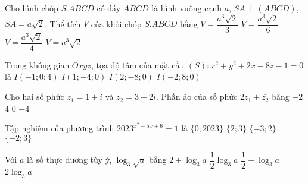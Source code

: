 \begin{ex}%
	Cho hình chóp $S.ABCD$ có đáy $ABCD$ là hình vuông cạnh $a$, $SA\perp (ABCD)$, $SA=a\sqrt{2}$. Thể tích $V$ của khối chóp $S.ABCD$ bằng
	\choice
	{\True $V=\dfrac{a^3\sqrt{2}}{3}$}
	{$V=\dfrac{a^3\sqrt{2}}{6}$}
	{$V=\dfrac{a^3\sqrt{2}}{4}$}
	{$V=a^3\sqrt{2}$}
\end{ex}
\begin{ex}%
	Trong không gian $Oxyz$, tọa độ tâm của mặt cầu $(S)\colon x^2+y^2+2x-8z-1=0$ là
	\choice
	{\True $I(-1;0;4)$}
	{$I(1;-4;0)$}
	{$I(2;-8;0)$}
	{$I(-2;8;0)$}
\end{ex}
\begin{ex}%
	Cho hai số phức $z_1=1+i$ và $z_2=3-2i$. Phần ảo của số phức $2z_1+\bar{z_2}$ bằng
	\choice
	{$-2$}
	{\True $4$}
	{$0$}
	{$-4$}
\end{ex}
\begin{ex}%
	Tập nghiệm của phương trình $2023^{x^2-5x+6}=1$ là
	\choice
	{$\{0;2023\}$}
	{\True $\{2;3\}$}
	{$\{-3;2\}$}
	{$\{-2;3\}$}
\end{ex}
\begin{ex}%
	Với $a$ là số thực dương tùy ý, $\log_3\sqrt{a}$ bằng
	\choice
	{$2+\log_3a$}
	{\True $\dfrac{1}{2}\log_3a$}
	{$\dfrac{1}{2}+\log_3a$}
	{$2\log_3a$}
\end{ex}

